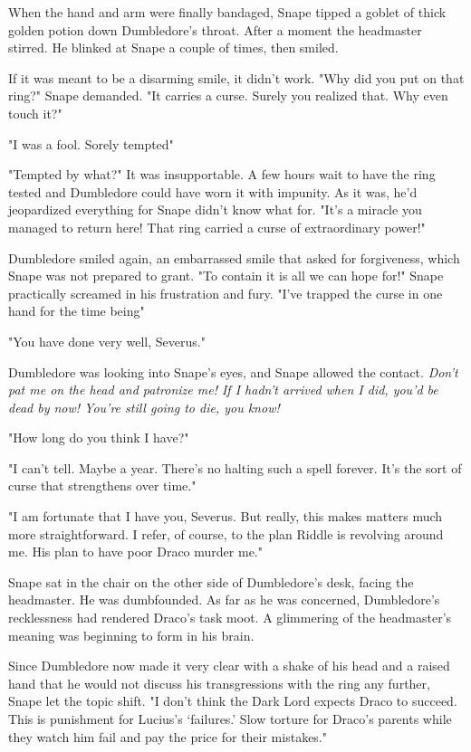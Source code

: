 When the hand and arm were finally bandaged, Snape tipped a goblet of thick golden potion down Dumbledore's throat. After a moment the headmaster stirred. He blinked at Snape a couple of times, then smiled.

If it was meant to be a disarming smile, it didn't work. "Why did you put on that ring?" Snape demanded. "It carries a curse. Surely you realized that. Why even touch it?"

"I{\el} was a fool. Sorely tempted{\el}"

"Tempted by what?" It was insupportable. A few hours wait to have the ring tested and Dumbledore could have worn it with impunity. As it was, he'd jeopardized everything for{\el} Snape didn't know what for. "It's a miracle you managed to return here! That ring{\el} carried a curse of extraordinary power!"

Dumbledore smiled again, an embarrassed smile that asked for forgiveness, which Snape was not prepared to grant. "To contain it is all we can hope for!" Snape practically screamed in his frustration and fury. "I've trapped the curse in one hand for the time being{\el}"

"You have done very well, Severus."

Dumbledore was looking into Snape's eyes, and Snape allowed the contact. \emph{Don't pat me on the head and patronize me! If I hadn't arrived when I did, you'd be dead by now! You're still going to die, you know!}

"How long do you think I have?"

"I can't tell. Maybe a year. There's no halting such a spell forever. It's the sort of curse that strengthens over time."

"I am fortunate that I have you, Severus. But really, this makes matters much more straightforward. I refer, of course, to the plan Riddle is revolving around me. His plan to have poor Draco murder me."

Snape sat in the chair on the other side of Dumbledore's desk, facing the headmaster. He was dumbfounded. As far as he was concerned, Dumbledore's recklessness had rendered Draco's task moot. A glimmering of the headmaster's meaning was beginning to form in his brain.

Since Dumbledore now made it very clear with a shake of his head and a raised hand that he would not discuss his transgressions with the ring any further, Snape let the topic shift. "I don't think the Dark Lord expects Draco to succeed. This is punishment for Lucius's `failures.' Slow torture for Draco's parents while they watch him fail and pay the price for their mistakes."

